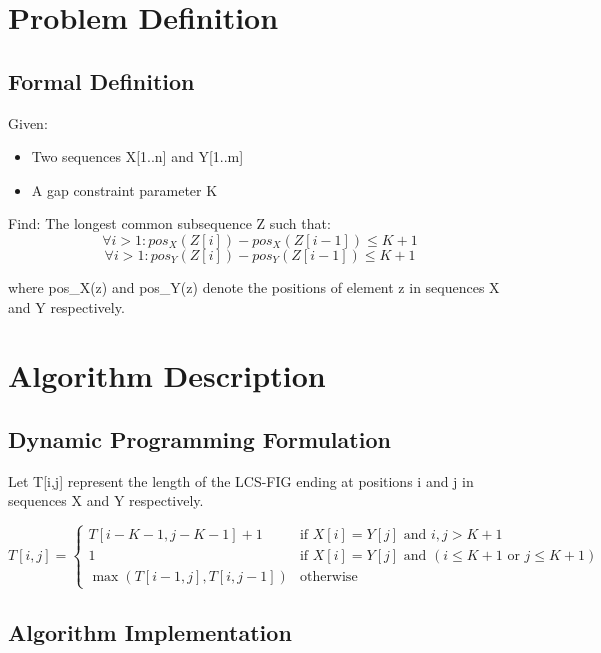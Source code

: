 \documentclass[12pt]{article}
\begin{document}
\section{Problem Definition}

\subsection{Formal Definition}
Given:
\begin{itemize}
    \item Two sequences X[1..n] and Y[1..m]
    \item A gap constraint parameter K
\end{itemize}

Find: The longest common subsequence Z such that:
\begin{equation}
    \forall i > 1: pos_X(Z[i]) - pos_X(Z[i-1]) \leq K + 1
\end{equation}
\begin{equation}
    \forall i > 1: pos_Y(Z[i]) - pos_Y(Z[i-1]) \leq K + 1
\end{equation}

where pos_X(z) and pos_Y(z) denote the positions of element z in sequences X and Y respectively.

\section{Algorithm Description}

\subsection{Dynamic Programming Formulation}

Let T[i,j] represent the length of the LCS-FIG ending at positions i and j in sequences X and Y respectively.

\begin{equation}
T[i,j] = \begin{cases}
    T[i-K-1,j-K-1] + 1 & \text{if } X[i]=Y[j] \text{ and } i,j > K+1\\
    1 & \text{if } X[i]=Y[j] \text{ and } (i \leq K+1 \text{ or } j \leq K+1)\\
    \max(T[i-1,j], T[i,j-1]) & \text{otherwise}
\end{cases}
\end{equation}

\subsection{Algorithm Implementation}
\end{document}
